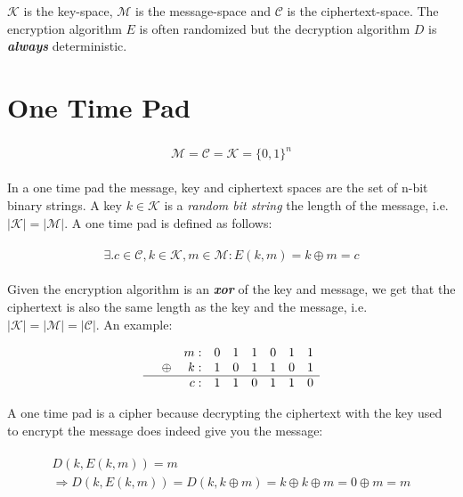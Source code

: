 \documentclass[11pt,a4paper]{report}
\begin{document}
\noindent
$\mathscr{K}$ is the key-space, $\mathscr{M}$ is the message-space and $\mathscr{C}$ is the ciphertext-space. The encryption algorithm $E$ is often randomized but the decryption algorithm $D$ is \emph{\textbf{always}} deterministic.

\section{One Time Pad\textsuperscript{\cite{1}}}

\begin{gather}
	\begin{gathered}
		\mathscr{M} = \mathscr{C} = \mathscr{K} = \{0,1\}^n			
	\end{gathered}	
\end{gather}

\noindent
In a one time pad the message, key and ciphertext spaces are the set of n-bit binary strings. A key $k \in \mathscr{K}$ is a \emph{random bit string} the length of the message, i.e. $|\mathscr{K}|=|\mathscr{M}|$. A one time pad is defined as follows:

\begin{gather}
	\begin{gathered}
		\exists. c \in \mathscr{C}, k \in \mathscr{K}, m \in \mathscr{M}: E(k, m) = k \oplus m = c
	\end{gathered}	
\end{gather}

Given the encryption algorithm is an \emph{\textbf{xor}} of the key and message, we get that the ciphertext is also the same length as the key and the message, i.e. $|\mathscr{K}|=|\mathscr{M}|=|\mathscr{C}|$. An example:

\[ \begin{array}{*9r}
    &		&m: &0 &1 &1 &0 &1 &1 \\
    &\oplus	&k:	&1 &0 &1 &1 &0 &1 \\ \hline
    &		&c:	&1 &1 &0 &1 &1 &0 \\ 
   \end{array} \]


A one time pad is a cipher because decrypting the ciphertext with the key used to encrypt the message does indeed give you the message:

\begin{gather}
	\begin{gathered}
		D(k, E(k, m)) = m \\
		\Rightarrow D(k, E(k, m)) = D(k, k \oplus m) = k \oplus k \oplus m = 0 \oplus m =m
	\end{gathered}
\end{gather}
\end{document}
